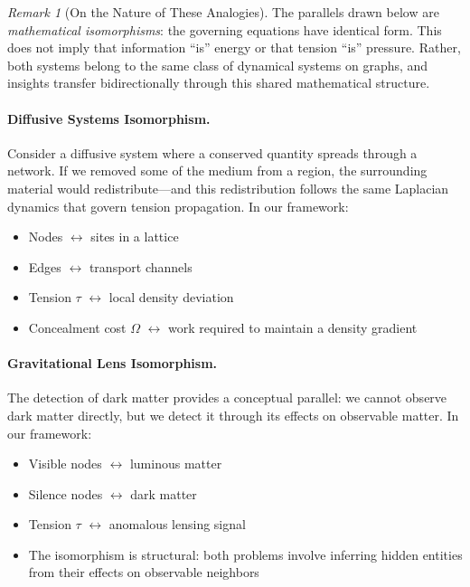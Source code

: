 \documentclass[12pt,a4paper]{article}
\theoremstyle{definition}
\theoremstyle{remark}
\newtheorem{remark}{Remark}[section]
\newcommand{\CO}{\Omega}                  %
\begin{document}
\begin{remark}[On the Nature of These Analogies]
The parallels drawn below are \emph{mathematical isomorphisms}: the governing equations have identical form. This does not imply that information ``is'' energy or that tension ``is'' pressure. Rather, both systems belong to the same class of dynamical systems on graphs, and insights transfer bidirectionally through this shared mathematical structure.
\end{remark}

\paragraph{Diffusive Systems Isomorphism.}
Consider a diffusive system where a conserved quantity spreads through a network. If we removed some of the medium from a region, the surrounding material would redistribute---and this redistribution follows the same Laplacian dynamics that govern tension propagation. In our framework:
\begin{itemize}
    \item Nodes $\leftrightarrow$ sites in a lattice
    \item Edges $\leftrightarrow$ transport channels
    \item Tension $\tau$ $\leftrightarrow$ local density deviation
    \item Concealment cost $\CO$ $\leftrightarrow$ work required to maintain a density gradient
\end{itemize}

\paragraph{Gravitational Lens Isomorphism.}
The detection of dark matter provides a conceptual parallel: we cannot observe dark matter directly, but we detect it through its effects on observable matter. In our framework:
\begin{itemize}
    \item Visible nodes $\leftrightarrow$ luminous matter
    \item Silence nodes $\leftrightarrow$ dark matter
    \item Tension $\tau$ $\leftrightarrow$ anomalous lensing signal
    \item The isomorphism is structural: both problems involve inferring hidden entities from their effects on observable neighbors
\end{itemize}
\end{document}
